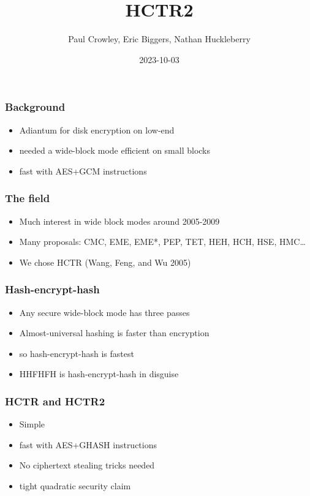 \documentclass{beamer}
\title{HCTR2}
\author{Paul Crowley, Eric Biggers, Nathan Huckleberry}
\institute{Google LLC}
\date{2023-10-03}
\begin{document}
\frame{\titlepage}

\begin{frame}

\frametitle{Background}

\begin{itemize}
    \item Adiantum for disk encryption on low-end
    \item needed a wide-block mode efficient on small blocks
    \item fast with AES+GCM instructions
\end{itemize}
\end{frame}

\begin{frame}

\frametitle{The field}

\begin{itemize}
    \item Much interest in wide block modes around 2005-2009
    \item Many proposals: CMC, EME, EME*, PEP, TET, HEH, HCH, HSE, HMC…
    \item We chose HCTR (Wang, Feng, and Wu 2005)
\end{itemize}
\end{frame}

\begin{frame}

\frametitle{Hash-encrypt-hash}

\begin{itemize}
    \item Any secure wide-block mode has three passes
    \item Almost-universal hashing is faster than encryption
    \item so hash-encrypt-hash is fastest
    \item HHFHFH is hash-encrypt-hash in disguise
\end{itemize}
\end{frame}

\begin{frame}

\frametitle{HCTR and HCTR2}

\begin{itemize}
    \item Simple
    \item fast with AES+GHASH instructions
    \item No ciphertext stealing tricks needed
    \item tight quadratic security claim
\end{itemize}
\end{frame}
\end{document}

